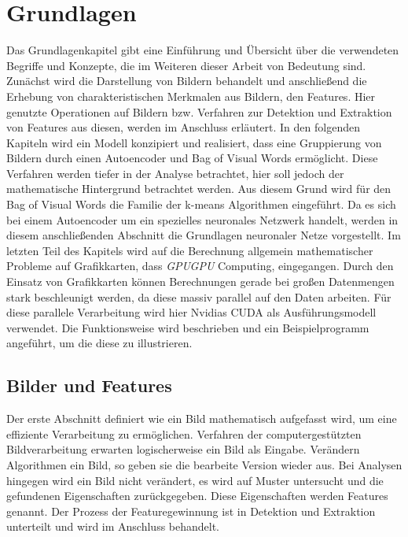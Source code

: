 \chapter{Grundlagen}

Das Grundlagenkapitel gibt eine Einführung und Übersicht über die verwendeten Begriffe und Konzepte, die im Weiteren dieser Arbeit von Bedeutung sind. Zunächst wird die Darstellung von Bildern behandelt und anschließend die Erhebung von charakteristischen Merkmalen aus Bildern, den Features. Hier genutzte Operationen auf Bildern bzw. Verfahren zur Detektion und Extraktion von Features aus diesen, werden im Anschluss erläutert.\newline
In den folgenden Kapiteln wird ein Modell konzipiert und realisiert, dass eine Gruppierung von Bildern durch einen Autoencoder und Bag of Visual Words ermöglicht. Diese Verfahren werden tiefer in der Analyse betrachtet, hier soll jedoch der mathematische Hintergrund betrachtet werden. Aus diesem Grund wird für den Bag of Visual Words die Familie der k-means Algorithmen eingeführt. Da es sich bei einem Autoencoder um ein spezielles neuronales Netzwerk handelt, werden in diesem anschließenden Abschnitt die Grundlagen neuronaler Netze vorgestellt.\newline
Im letzten Teil des Kapitels wird auf die Berechnung allgemein mathematischer Probleme auf Grafikkarten, dass \textit{GPUGPU} Computing, eingegangen. Durch den Einsatz von Grafikkarten können Berechnungen gerade bei großen Datenmengen stark beschleunigt werden, da diese massiv parallel auf den Daten arbeiten. Für diese parallele Verarbeitung wird hier Nvidias CUDA als Ausführungsmodell verwendet. Die Funktionsweise wird beschrieben und ein Beispielprogramm angeführt, um die diese zu illustrieren. 

\section{Bilder und Features}

Der erste Abschnitt definiert wie ein Bild mathematisch aufgefasst wird, um eine effiziente Verarbeitung zu ermöglichen. Verfahren der computergestützten Bildverarbeitung erwarten logischerweise ein Bild als Eingabe. Verändern Algorithmen ein Bild, so geben sie die bearbeite Version wieder aus. Bei Analysen hingegen wird ein Bild nicht verändert, es wird auf Muster untersucht und die gefundenen Eigenschaften zurückgegeben. Diese Eigenschaften werden Features genannt. Der Prozess der Featuregewinnung ist in Detektion und Extraktion unterteilt und wird im Anschluss behandelt.

